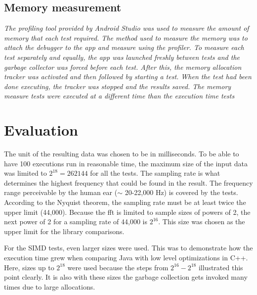 
\subsection{Memory measurement}
\emph{The profiling tool provided by Android Studio was used to measure the amount of memory that each test required. The method used to measure the memory was to attach the debugger to the app and measure using the profiler. To measure each test separately and equally, the app was launched freshly between tests and the garbage collector was forced before each test. After this, the memory allocation tracker was activated and then followed by starting a test. When the test had been done executing, the tracker was stopped and the results saved. The memory measure tests were executed at a different time than the execution time tests}

\section{Evaluation}
The unit of the resulting data was chosen to be in milliseconds. To be able to have 100 executions run in reasonable time, the maximum size of the input data was limited to $2^{18} = 262144$ for all the tests. The sampling rate is what determines the highest frequency that could be found in the result. The frequency range perceivable by the human ear ($\sim$ 20-22,000 Hz) is covered by the tests. According to the Nyquist theorem, the sampling rate must be at least twice the upper limit (44,000). Because the \gls{fft} is limited to sample sizes of powers of 2, the next power of 2 for a sampling rate of 44,000 is $2^{16}$. This size was chosen as the upper limit for the library comparisons.

For the SIMD tests, even larger sizes were used. This was to demonstrate how the execution time grew when comparing Java with low level optimizations in C++. Here, sizes up to $2^{18}$ were used because the steps from $2^{16} - 2^{18}$ illustrated this point clearly. It is also with these sizes the garbage collection gets invoked many times due to large allocations.

